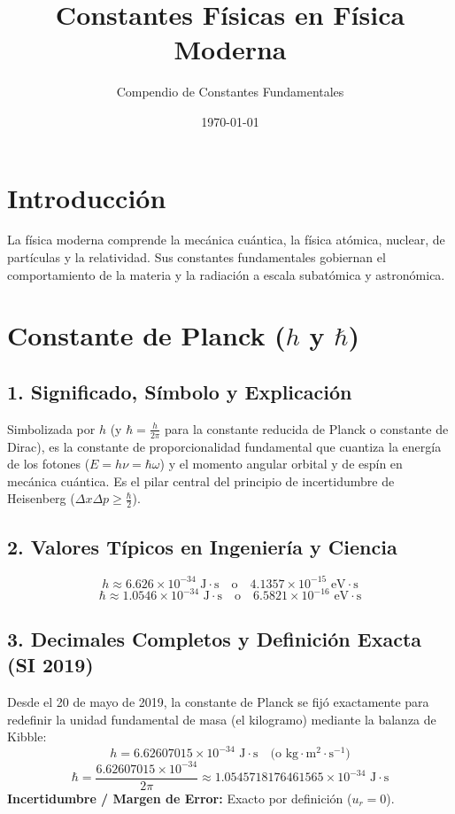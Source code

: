 \documentclass[12pt,a4paper]{article}
\title{\textbf{Constantes Físicas en Física Moderna}}
\author{Compendio de Constantes Fundamentales}
\date{\today}
\begin{document}
\maketitle

\section*{Introducción}
La física moderna comprende la mecánica cuántica, la física atómica, nuclear, de partículas y la relatividad. Sus constantes fundamentales gobiernan el comportamiento de la materia y la radiación a escala subatómica y astronómica.

\section{Constante de Planck ($h$ y $\hbar$)}

\subsection*{1. Significado, Símbolo y Explicación}
Simbolizada por $h$ (y $\hbar = \frac{h}{2\pi}$ para la constante reducida de Planck o constante de Dirac), es la constante de proporcionalidad fundamental que cuantiza la energía de los fotones ($E = h\nu = \hbar\omega$) y el momento angular orbital y de espín en mecánica cuántica. Es el pilar central del principio de incertidumbre de Heisenberg ($\Delta x \Delta p \ge \frac{\hbar}{2}$).

\subsection*{2. Valores Típicos en Ingeniería y Ciencia}
\begin{equation*}
h \approx 6.626 \times 10^{-34} \text{ J}\cdot\text{s} \quad \text{o} \quad 4.1357 \times 10^{-15} \text{ eV}\cdot\text{s}
\end{equation*}
\begin{equation*}
\hbar \approx 1.0546 \times 10^{-34} \text{ J}\cdot\text{s} \quad \text{o} \quad 6.5821 \times 10^{-16} \text{ eV}\cdot\text{s}
\end{equation*}

\subsection*{3. Decimales Completos y Definición Exacta (SI 2019)}
Desde el 20 de mayo de 2019, la constante de Planck se fijó exactamente para redefinir la unidad fundamental de masa (el kilogramo) mediante la balanza de Kibble:
\begin{equation*}
h = 6.62607015 \times 10^{-34} \text{ J}\cdot\text{s} \quad \text{(o kg}\cdot\text{m}^2\cdot\text{s}^{-1}\text{)}
\end{equation*}
\begin{equation*}
\hbar = \frac{6.62607015 \times 10^{-34}}{2\pi} \approx 1.0545718176461565 \times 10^{-34} \text{ J}\cdot\text{s}
\end{equation*}
\textbf{Incertidumbre / Margen de Error:} Exacto por definición ($u_r = 0$).
\end{document}
